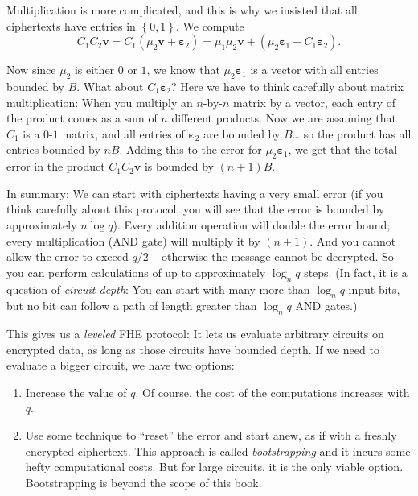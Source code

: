 Multiplication is more complicated, and this is why we insisted that all
ciphertexts have entries in \(\left\{ 0,1 \right\}\). We compute
\[C_{1}C_{2}\mathbf{v} = C_{1}\left( \mu_{2}\mathbf{v} + \mathbf{\varepsilon}_{2} \right) = \mu_{1}\mu_{2}\mathbf{v} + \left( \mu_{2}\mathbf{\varepsilon}_{1} + C_{1}\mathbf{\varepsilon}_{2} \right).\]

Now since \(\mu_{2}\) is either \(0\) or \(1\), we know that
\(\mu_{2}\mathbf{\varepsilon}_{1}\) is a vector with all entries bounded
by \(B\). What about \(C_{1}\mathbf{\varepsilon}_{2}\)? Here we have to
think carefully about matrix multiplication: When you multiply an
\(n\)-by-\(n\) matrix by a vector, each entry of the product comes as a
sum of \(n\) different products. Now we are assuming that \(C_{1}\) is a
\(0\)-\(1\) matrix, and all entries of \(\mathbf{\varepsilon}_{2}\) are
bounded by \(B\)\ldots{} so the product has all entries bounded by
\(nB\). Adding this to the error for
\(\mu_{2}\mathbf{\varepsilon}_{1}\), we get that the total error in the
product \(C_{1}C_{2}\mathbf{v}\) is bounded by \((n + 1)B\).

In summary: We can start with ciphertexts having a very small error (if
you think carefully about this protocol, you will see that the error is
bounded by approximately \(n\log q\)). Every addition operation will
double the error bound; every multiplication (AND gate) will multiply it
by \((n + 1)\). And you cannot allow the error to exceed \(q/2\) --
otherwise the message cannot be decrypted. So you can perform
calculations of up to approximately \(\log_{n}q\) steps. (In fact, it is
a question of \emph{circuit depth}: You can start with many more than
\(\log_{n}q\) input bits, but no bit can follow a path of length greater
than \(\log_{n}q\) AND gates.)

This gives us a \emph{leveled} FHE protocol: It lets us evaluate
arbitrary circuits on encrypted data, as long as those circuits have
bounded depth. If we need to evaluate a bigger circuit, we have two
options:

\begin{enumerate}
\item
  Increase the value of \(q\). Of course, the cost of the computations
  increases with \(q\).
\item
  Use some technique to ``reset'' the error and start anew, as if with a
  freshly encrypted ciphertext. This approach is called
  \emph{bootstrapping} and it incurs some hefty computational costs. But
  for large circuits, it is the only viable option. Bootstrapping is
  beyond the scope of this book.
\end{enumerate}
